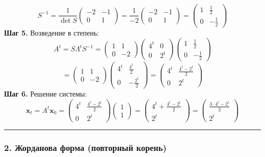 {$$S^{-1} = \frac{1}{\det S}\begin{pmatrix} -2 & -1 \\ 0 & 1 \end{pmatrix} = \frac{1}{-2}\begin{pmatrix} -2 & -1 \\ 0 & 1 \end{pmatrix} = \begin{pmatrix} 1 & \frac{1}{2} \\ 0 & -\frac{1}{2} \end{pmatrix}$$
\textbf{Шаг 5.} Возведение в степень:
$$A^t = S\Lambda^t S^{-1} = \begin{pmatrix} 1 & 1 \\ 0 & -2 \end{pmatrix}\begin{pmatrix} 4^t & 0 \\ 0 & 2^t \end{pmatrix}\begin{pmatrix} 1 & \frac{1}{2} \\ 0 & -\frac{1}{2} \end{pmatrix}$$
$$= \begin{pmatrix} 1 & 1 \\ 0 & -2 \end{pmatrix}\begin{pmatrix} 4^t & \frac{4^t}{2} \\ 0 & -\frac{2^t}{2} \end{pmatrix} = \begin{pmatrix} 4^t & \frac{4^t - 2^t}{2} \\ 0 & 2^t \end{pmatrix}$$
\textbf{Шаг 6.} Решение системы:
$$\mathbf{x}_t = A^t\mathbf{x}_0 = \begin{pmatrix} 4^t & \frac{4^t - 2^t}{2} \\ 0 & 2^t \end{pmatrix}\begin{pmatrix} 1 \\ 1 \end{pmatrix} = \begin{pmatrix} 4^t + \frac{4^t - 2^t}{2} \\ 2^t \end{pmatrix} = \begin{pmatrix} \frac{3 \cdot 4^t - 2^t}{2} \\ 2^t \end{pmatrix}$$
}

\bigskip
\hrule
\bigskip

\subsubsection*{2. Жорданова форма (повторный корень)}

